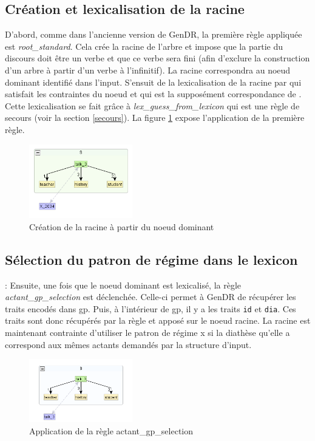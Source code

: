 \subsection{Création et lexicalisation de la racine}
D'abord, comme dans l'ancienne version de GenDR, la première règle appliquée est \emph{root\_standard}. Cela crée la racine de l'arbre et impose que la partie du discours doit être un verbe et que ce verbe sera fini (afin d'exclure la construction d'un arbre à partir d'un verbe à l'infinitif). La racine correspondra au noe{}ud dominant identifié dans l'input. S'ensuit de la lexicalisation de la racine par  qui satisfait les contraintes du noe{}ud et qui est la supposément correspondance de . Cette lexicalisation se fait grâce à \emph{lex\_guess\_from\_lexicon} qui est une règle de secours (voir la section \ref{secours}). La figure \ref{deroulement0} expose l'application de la première règle.

\begin{figure}[htb]
	\centering
	\includegraphics[width=0.4\textwidth, trim = {0cm 0cm 0cm 0cm},clip]{ch6/figs/root.png}
	\caption{Création de la racine à partir du noe{}ud dominant}
	\label{deroulement0}
\end{figure}

\subsection{Sélection du patron de régime dans le lexicon}:
Ensuite, une fois que le noe{}ud dominant est lexicalisé, la règle \emph{actant\_gp\_selection} est déclenchée. Celle-ci permet à GenDR de récupérer les traits encodés dans gp. Puis, à l'intérieur de gp, il y a les traits \texttt{id} et \texttt{dia}. Ces traits sont donc récupérés par la règle et apposé sur le noe{}ud racine. La racine est maintenant contrainte d'utiliser le patron de régime x si la diathèse qu'elle a correspond aux mêmes actants demandés par la structure d'input.

\begin{figure}[htb]
	\centering
	\includegraphics[width=0.4\textwidth, trim = {0cm 0cm 0cm 0cm},clip]{ch6/figs/selectiongp.png}
	\caption{Application de la règle actant\_gp\_selection}
	\label{deroulement1}
\end{figure}

